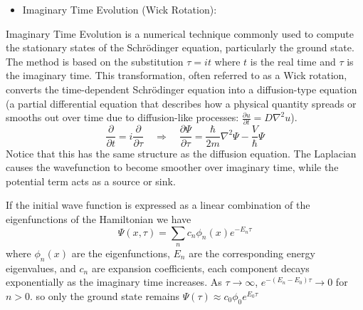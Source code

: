 \documentclass[11pt]{article}
\begin{document}
\begin{itemize}
	\item 
	Imaginary Time Evolution (Wick Rotation):
\end{itemize}
Imaginary Time Evolution is a numerical technique commonly used to compute the stationary states of the Schrödinger equation, particularly the ground state. The method is based on the substitution $\tau = it$ where $t$ is the real time and $\tau$ is the imaginary time. This transformation, often referred to as a Wick rotation, converts the time-dependent Schrödinger equation into a diffusion-type equation (a partial differential equation that describes how a physical quantity spreads or smooths out over time due to diffusion-like processes: $\frac{\partial u}{\partial t} = D \nabla^2 u$).
\begin{equation}
	\frac{\partial}{\partial t} = i \frac{\partial}{\partial \tau} \quad \Rightarrow \quad
	\frac{\partial \Psi}{\partial \tau} = \frac{\hbar}{2m} \nabla^2 \Psi - \frac{V}{\hbar} \Psi 
\end{equation}
Notice that this has the same structure as the diffusion equation. The Laplacian causes the wavefunction to become smoother over imaginary time, while the potential term acts as a source or sink.

If the initial wave function is expressed as a linear combination of the eigenfunctions of the Hamiltonian we have
\begin{equation}
	\Psi(x, \tau) = \sum_{n} c_n \phi_n (x) e^{-E_n \tau}
\end{equation}
where $\phi_n(x)$ are the eigenfunctions, $E_n$ are the corresponding energy eigenvalues, and $c_n$ are expansion coefficients, each component decays exponentially as the imaginary time increases. As $ \tau \to \infty $, $e^{-(E_n - E_0) \tau} \to 0$ for $n > 0$. so only the ground state remains $\Psi (\tau) \approx c_0 \phi_0 e^{E_0 \tau}$
\end{document}
